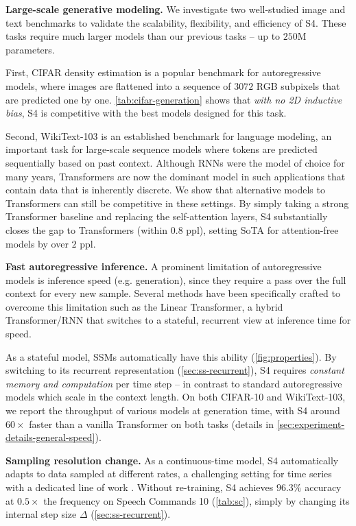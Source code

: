 \textbf{Large-scale generative modeling.} We investigate two well-studied image and text benchmarks to validate the scalability, flexibility, and efficiency of S4. These tasks require much larger models than our previous tasks -- up to $250$M parameters.

First, CIFAR density estimation is a popular benchmark for autoregressive models, where images are flattened into a sequence of $3072$ RGB subpixels that are predicted one by one.
\ref{tab:cifar-generation} shows that \emph{with no 2D inductive bias}, S4 is competitive with the best models designed for this task.

Second, WikiText-103 is an established benchmark for language modeling, an important task for large-scale sequence models where tokens are predicted sequentially based on past context. Although RNNs were the model of choice for many years, Transformers are now the dominant model in such applications that contain data that is inherently discrete. We show that alternative models to Transformers can still be competitive in these settings. By simply taking a strong Transformer baseline \citep{baevski2018adaptive} and replacing the self-attention layers, S4 substantially closes the gap to Transformers (within $0.8$ ppl), setting SoTA for attention-free models by over $2$ ppl.

\textbf{Fast autoregressive inference.} A prominent limitation of autoregressive models is inference speed (e.g. generation), since they require a pass over the full context for every new sample. Several methods have been specifically crafted to overcome this limitation such as the Linear Transformer, a hybrid Transformer/RNN that switches to a stateful, recurrent view at inference time for speed.

As a stateful model, SSMs automatically have this ability (\ref{fig:properties}).
By switching to its recurrent representation (\ref{sec:ss-recurrent}),
S4 requires \emph{constant memory and computation} per time step -- in contrast to standard autoregressive models which scale in the context length. On both CIFAR-10 and WikiText-103, we report the throughput of various models at generation time, with S4 around $60\times$ faster than a vanilla Transformer on both tasks (details in \ref{sec:experiment-details-general-speed}).

\textbf{Sampling resolution change.} As a continuous-time model, S4 automatically adapts to data sampled at different rates, a challenging setting for time series with a dedicated line of work \citep{rubanova2019latent,de2019gru,romero2021ckconv}. Without re-training, S4 achieves $96.3\%$ accuracy at $0.5\times$ the frequency on Speech Commands 10 (\ref{tab:sc}), simply by changing its internal step size \( \Delta \) (\ref{sec:ss-recurrent}).

